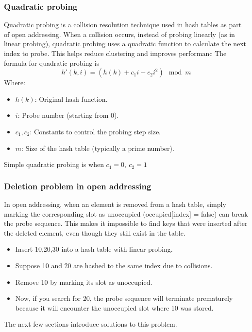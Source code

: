 \documentclass{report}
\begin{document}
\bigbreak \noindent 
\subsubsection{Quadratic probing}
\bigbreak \noindent 
Quadratic probing is a collision resolution technique used in hash tables as part of open addressing. When a collision occurs, instead of probing linearly (as in linear probing), quadratic probing uses a quadratic function to calculate the next index to probe. This helps reduce clustering and improves performanc
\bigbreak \noindent 
The formula for quadratic probing is
\[
h'(k, i) = \left(h(k) + c_1 i + c_2 i^2\right) \mod m
\]
Where:
\begin{itemize}
    \item \(h(k)\): Original hash function.
    \item \(i\): Probe number (starting from 0).
    \item \(c_1, c_2\): Constants to control the probing step size.
    \item \(m\): Size of the hash table (typically a prime number).
\end{itemize}
\bigbreak \noindent 
Simple quadratic probing is when $c_{1} = 0,\ c_{2} = 1$

\bigbreak \noindent 
\subsubsection{Deletion problem in open addressing}
\bigbreak \noindent 
In open addressing, when an element is removed from a hash table, simply marking the corresponding slot as unoccupied (occupied[index] = false) can break the probe sequence. This makes it impossible to find keys that were inserted after the deleted element, even though they still exist in the table.
\begin{itemize}
    \item Insert 10,20,30 into a hash table with linear probing.
    \item Suppose 10 and 20 are hashed to the same index due to collisions.
    \item Remove 10 by marking its slot as unoccupied.
    \item Now, if you search for 20, the probe sequence will terminate prematurely because it will encounter the unoccupied slot where 10 was stored.
\end{itemize}
\bigbreak \noindent 
The next few sections introduce solutions to this problem.


\bigbreak \noindent 
\end{document}
